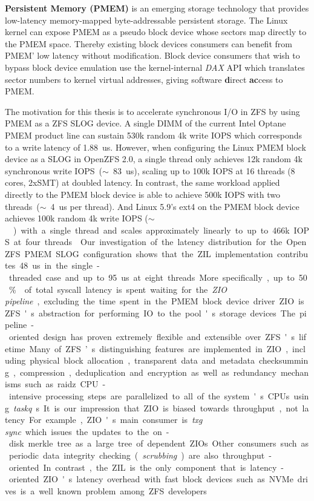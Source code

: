 \documentclass[12pt,a4paper,twoside,draft]{book}
\begin{document}
\textbf{Persistent Memory (PMEM)} is an emerging storage technology that provides low-latency memory-mapped byte-addressable persistent storage.
The Linux kernel can expose PMEM as a pseudo block device whose sectors map directly to the PMEM space.
Thereby existing block devices consumers can benefit from PMEM' low latency without modification.
Block device consumers that wish to bypass block device emulation use the kernel-internal \textit{DAX} API which translates sector numbers to kernel virtual addresses, giving software \textbf{d}irect \textbf{ac}cess to PMEM.

The motivation for this thesis is to accelerate synchronous I/O in ZFS by using PMEM as a ZFS SLOG device.
A single DIMM of the current Intel Optane PMEM product line can sustain 530k random 4k write IOPS which corresponds to a write latency of \SI{1.88}{us}.
However, when configuring the Linux PMEM block device as a SLOG in OpenZFS 2.0, a single thread only achieves 12k random 4k synchronous write IOPS~($\sim$~\SI{83}{us}), scaling up to 100k IOPS at 16 threads (8 cores, 2xSMT) at doubled latency.
In contrast, the same workload applied directly to the PMEM block device is able to achieve 500k IOPS with two threads~($\sim$~\SI{4}{us} per thread).
And Linux 5.9's ext4 on the PMEM block device achieves 100k random 4k write IOPS ($\sim$~\SI{}) with a single thread and scales approximately linearly to up to 466k IOPS at four threads.

Our investigation of the latency distribution for the OpenZFS PMEM SLOG configuration shows that the ZIL implementation contributes \SI{48}{us} in the single-threaded case and up to \SI{95}{us} at eight threads.
More specifically, up to \SI{50}{\%} of total syscall latency is spent waiting for the \textit{ZIO pipeline}, excluding the time spent in the PMEM block device driver.

ZIO is ZFS's abstraction for performing IO to the pool's storage devices.
The pipeline-oriented design has proven extremely flexible and extensible over ZFS's lifetime.
Many of ZFS’s distinguishing features are implemented in ZIO, including physical block allocation, transparent data and metadata checksumming, compression, deduplication and encryption as well as redundancy mechanisms such as raidz.
CPU-intensive processing steps are parallelized to all of the system's CPUs using \textit{taskq}s.

It is our impression that ZIO is biased towards throughput, not latency.
For example, ZIO's main consumer is \textit{txg sync} which issues the updates to the on-disk merkle tree as a large tree of dependent ZIOs.
Other consumers such as periodic data integrity checking (\textit{scrubbing}) are also throughput-oriented.
In contrast, the ZIL is the only component that is latency-oriented.
ZIO's latency overhead with fast block devices such as NVMe drives is a well known problem among ZFS developers.
\end{document}
